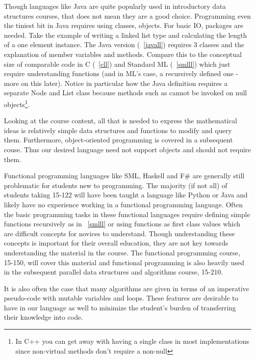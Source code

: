Though languages like Java are quite popularly used in introductory data
structures courses, that does not mean they are a good choice.  Programming
even the tiniest bit in Java requires using classes, objects. For basic IO,
packages are needed.  Take the example of writing a linked list type and
calculating the length of a one element instance. The Java\cite{JavaSpec}
version (~\ref{javall}) requires 3 classes and the explanation of member
variables and methods. Compare this to the conceptual size of comparable code
in C\cite{ISO:C99} (~\ref{cll}) and Standard ML\cite{mthm97} (~\ref{smlll})
which just require understanding functions (and in ML's case, a recursively
defined one - more on this later).  Notice in particular how the Java
definition requires a separate Node and List class because methods such as
 cannot be invoked on null objects\footnote{In C++ you can
get away with having a single class in most implementations since non-virtual
methods don't require a non-null }.


Looking at the course content, all that is needed to express the mathematical
ideas is relatively simple data structures and functions to modify and query
them. Furthermore, object-oriented programming is covered in a subsequent
couse. Thus our desired language need not support objects and should not
require them.

Functional programming languages like SML, Haskell and F\# are generally still
problematic for students new to programming. The majority (if not all) of
students taking 15-122 will have been taught a language like Python or Java and
likely have no experience working in a functional programming language. Often
the basic programming tasks in these functional languages require defining
simple functions recursively as in ~\ref{smlll} or using functions as first
class values which are difficult concepts for novices to understand. Though
understanding these concepts is important for their overall education, they are
not key towards understanding the material in the course. The functional
programming course, 15-150, will cover this material and functional programming
is also heavily used in the subsequent parallel data structures and algorithms
course, 15-210.

It is also often the case that many algorithms are given in terms of an
imperative pseudo-code with mutable variables and loops. These features are
desirable to have in our language as well to minimize the student's burden of
transferring their knowledge into code.

